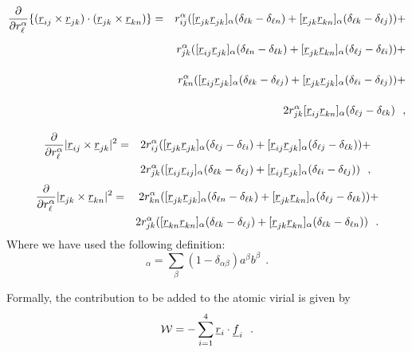 \begin{eqnarray}
\frac{\partial}{\partial r_{\ell}^{\alpha}}
\{(\vek{r}_{ij}\times\vek{r}_{jk})\cdot(\vek{r}_{jk}\times\vek{r}_{kn})\}&=&
r_{ij}^{\alpha}([\vek{r}_{jk}\vek{r}_{jk}]_{\alpha}(\delta_{\ell k}-\delta_{\ell n})+
 [\vek{r}_{jk}\vek{r}_{kn}]_{\alpha}(\delta_{\ell k}-\delta_{\ell j}))+ \nonumber \\
\phantom{\frac{\partial}{\partial r_{\ell}^{\alpha}}}& &
r_{jk}^{\alpha}([\vek{r}_{ij}\vek{r}_{jk}]_{\alpha}
(\delta_{\ell n}-\delta_{\ell k})+ [\vek{r}_{jk}\vek{r}_{kn}]_{\alpha}
(\delta_{\ell j}-\delta_{\ell i}))+ \nonumber \\
\phantom{\frac{\partial}{\partial r_{\ell}^{\alpha}}} & &
r_{kn}^{\alpha}([\vek{r}_{ij}\vek{r}_{jk}]_{\alpha}(\delta_{\ell k}-\delta_{\ell j})+
[\vek{r}_{jk}\vek{r}_{jk}]_{\alpha}(\delta_{\ell i}-\delta_{\ell j}))+ \nonumber \\
\phantom{\frac{\partial}{\partial r_{\ell}^{\alpha}}} & &
2r_{jk}^{\alpha}[\vek{r}_{ij}\vek{r}_{kn}]_{\alpha}(\delta_{\ell j}-\delta_{\ell k})~~,
\end{eqnarray}
\begin{eqnarray}
\frac{\partial}{\partial r_{\ell}^{\alpha}}
|\mbox{$\underline{r}$}_{ij}\times\mbox{$\underline{r}$}_{jk}|^{2}&=&
2r_{ij}^{\alpha}([\mbox{$\underline{r}$}_{jk}\mbox{$\underline{r}$}_{jk}]_{\alpha}(\delta_{\ell j}-\delta_{\ell i})+
[\mbox{$\underline{r}$}_{ij}\mbox{$\underline{r}$}_{jk}]_{\alpha}(\delta_{\ell j}-\delta_{\ell k}))+\nonumber \\
& & 2r_{jk}^{\alpha}([\mbox{$\underline{r}$}_{ij}\mbox{$\underline{r}$}_{ij}]_{\alpha}
(\delta_{\ell k}-\delta_{\ell j}) +[\mbox{$\underline{r}$}_{ij}\mbox{$\underline{r}$}_{jk}]_{\alpha}
(\delta_{\ell i}-\delta_{\ell j}))~~,
\end{eqnarray}
\begin{eqnarray}
\frac{\partial}{\partial r_{\ell}^{\alpha}}
|\mbox{$\underline{r}$}_{jk}\times\mbox{$\underline{r}$}_{kn}|^{2}&=&
2r_{kn}^{\alpha}([\mbox{$\underline{r}$}_{jk}\mbox{$\underline{r}$}_{jk}]_{\alpha}(\delta_{\ell n}-\delta_{\ell k})+
[\mbox{$\underline{r}$}_{jk}\mbox{$\underline{r}$}_{kn}]_{\alpha}(\delta_{\ell j}-\delta_{\ell k}))+\nonumber \\
& & 2r_{jk}^{\alpha}([\mbox{$\underline{r}$}_{kn}\mbox{$\underline{r}$}_{kn}]_{\alpha}
(\delta_{\ell k}-\delta_{\ell j})+
[\mbox{$\underline{r}$}_{jk}\mbox{$\underline{r}$}_{kn}]_{\alpha}(\delta_{\ell k}-\delta_{\ell n}))~~.
\end{eqnarray}
Where we have used the following definition:
\begin{equation}
[\vek{a}~\vek{b}]_{\alpha} =
\sum_{\beta}(1-\delta_{\alpha\beta})a^{\beta}b^{\beta}~~.
\end{equation}

Formally, the contribution to be added to the atomic virial is given
by
\begin{equation}
{\cal W}=-\sum_{i=1}^{4} \mbox{$\underline{r}$}_{i} \cdot \mbox{$\underline{f}$}_{i}~~.
\end{equation}

